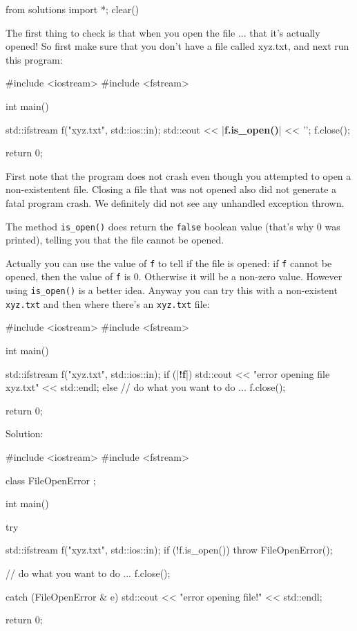 \begin{python0}
from solutions import *; clear()
\end{python0}

The first thing to check is that when you open the file ... that it's actually opened! So first make sure that you don't have a file called xyz.txt, and next run this program:

\begin{consolethree}[escapeinside=||]
#include <iostream>
#include <fstream>

int main()
{   
    std::ifstream f("xyz.txt", std::ios::in);
    std::cout << |\textbf{f.is\_open()}| << '\n';
    f.close();
    
    return 0;
}
\end{consolethree}

First note that the program does not crash even though you attempted to
open a non-existentent file. Closing a file that was not opened also did
not generate a fatal program crash. We definitely did not see any
unhandled exception thrown.

The method \verb!is_open()! does return the \texttt{false} boolean value (that's why 0 was printed), telling you that the file cannot be opened.

Actually you can use the value of \texttt{f} to tell if the file is opened: if \texttt{f} cannot be opened, then the value of \texttt{f} is 0. Otherwise it will be a non-zero value. However using \texttt{is\_open()} is a better idea. Anyway you can try this with a non-existent \texttt{xyz.txt} and then where there's an \texttt{xyz.txt} file:

\begin{consolethree}[escapeinside=||]
#include <iostream>
#include <fstream>

int main()
{   
    std::ifstream f("xyz.txt", std::ios::in);
    if (|\textbf{!f}|)
    {   
         std::cout << "error opening file xyz.txt"
                   << std::endl;
    }
    else
    {    
         // do what you want to do ...
         f.close();
    }

    return 0;

}
\end{consolethree}

Solution:

\begin{console}
#include <iostream>
#include <fstream>

class FileOpenError
{};

int main()
{   
    try
    {   
         std::ifstream f("xyz.txt", std::ios::in);
         if (!f.is_open())
            throw FileOpenError();

         // do what you want to do ...
         f.close();
     }
     catch (FileOpenError & e)
     {   
         std::cout << "error opening file!"
                   << std::endl;
     }

     return 0;
}
\end{console}

